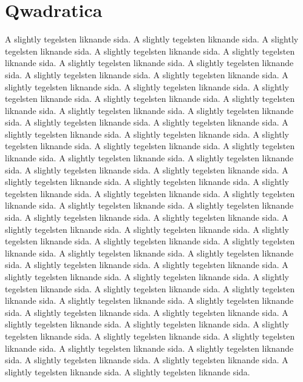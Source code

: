 \documentclass[cropmarks, frame, english]{idamasterthesis}
\begin{document}
\section{Qwadratica}

A slightly tegelsten liknande sida. 
A slightly tegelsten liknande sida. 
A slightly tegelsten liknande sida. 
A slightly tegelsten liknande sida. 
A slightly tegelsten liknande sida. 
A slightly tegelsten liknande sida. 
A slightly tegelsten liknande sida. 
A slightly tegelsten liknande sida. 
A slightly tegelsten liknande sida. 
A slightly tegelsten liknande sida. 
A slightly tegelsten liknande sida. 
A slightly tegelsten liknande sida. 
A slightly tegelsten liknande sida. 
A slightly tegelsten liknande sida. 
A slightly tegelsten liknande sida. 
A slightly tegelsten liknande sida. 
A slightly tegelsten liknande sida. 
A slightly tegelsten liknande sida. 
A slightly tegelsten liknande sida. 
A slightly tegelsten liknande sida. 
A slightly tegelsten liknande sida. 
A slightly tegelsten liknande sida. 
A slightly tegelsten liknande sida. 
A slightly tegelsten liknande sida. 
A slightly tegelsten liknande sida. 
A slightly tegelsten liknande sida. 
A slightly tegelsten liknande sida. 
A slightly tegelsten liknande sida. 
A slightly tegelsten liknande sida. 
A slightly tegelsten liknande sida. 
A slightly tegelsten liknande sida. 
A slightly tegelsten liknande sida. 
A slightly tegelsten liknande sida. 
A slightly tegelsten liknande sida. 
A slightly tegelsten liknande sida. 
A slightly tegelsten liknande sida. 
A slightly tegelsten liknande sida. 
A slightly tegelsten liknande sida. 
A slightly tegelsten liknande sida. 
A slightly tegelsten liknande sida. 
A slightly tegelsten liknande sida. 
A slightly tegelsten liknande sida. 
A slightly tegelsten liknande sida. 
A slightly tegelsten liknande sida. 
A slightly tegelsten liknande sida. 
A slightly tegelsten liknande sida. 
A slightly tegelsten liknande sida. 
A slightly tegelsten liknande sida. 
A slightly tegelsten liknande sida. 
A slightly tegelsten liknande sida. 
A slightly tegelsten liknande sida. 
A slightly tegelsten liknande sida. 
A slightly tegelsten liknande sida. 
A slightly tegelsten liknande sida. 
A slightly tegelsten liknande sida. 
A slightly tegelsten liknande sida. 
A slightly tegelsten liknande sida. 
A slightly tegelsten liknande sida. 
A slightly tegelsten liknande sida. 
A slightly tegelsten liknande sida. 
A slightly tegelsten liknande sida. 
A slightly tegelsten liknande sida. 
A slightly tegelsten liknande sida. 
A slightly tegelsten liknande sida. 
A slightly tegelsten liknande sida. 
\end{document}
